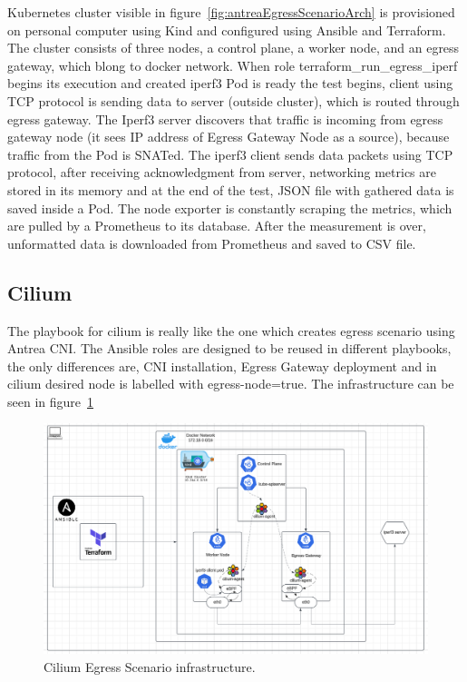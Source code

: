 Kubernetes cluster visible in figure~\ref{fig:antreaEgressScenarioArch} is provisioned on personal computer using Kind and configured using Ansible and Terraform. The cluster consists of three nodes, a control plane, a worker node, and an egress gateway, which blong to docker network. When role terraform\_run\_egress\_iperf begins its execution and created iperf3 Pod is ready the test begins, client using TCP protocol is sending data to server (outside cluster), which is routed through egress gateway. The Iperf3 server discovers that traffic is incoming from egress gateway node (it sees IP address of Egress Gateway Node as a source), because traffic from the Pod is SNATed.
The iperf3 client sends data packets using TCP protocol, after receiving acknowledgment from server, networking metrics are stored in its memory and at the end of the test, JSON file with gathered data is saved inside a Pod. The node exporter is constantly scraping the metrics, which are pulled by a Prometheus to its database. After the measurement is over, unformatted data is downloaded from Prometheus and saved to CSV file.



\subsection{Cilium}
\label{sec:ciliumEgress}

The playbook for cilium is really like the one which creates egress scenario using Antrea CNI. The Ansible roles are designed to be reused in different playbooks, the only differences are, CNI installation, Egress Gateway deployment and in cilium desired node is labelled with egress-node=true. The infrastructure can be seen in figure~\ref{fig:ciliumEgressGatewayScenarioArch} %

\begin{figure}[H]
  \centering
  \includegraphics[width=1\columnwidth]{images/cilium_egress_gatateway_cluster.png}
  \caption{Cilium Egress Scenario infrastructure.}
  \label{fig:ciliumEgressGatewayScenarioArch}
\end{figure}

